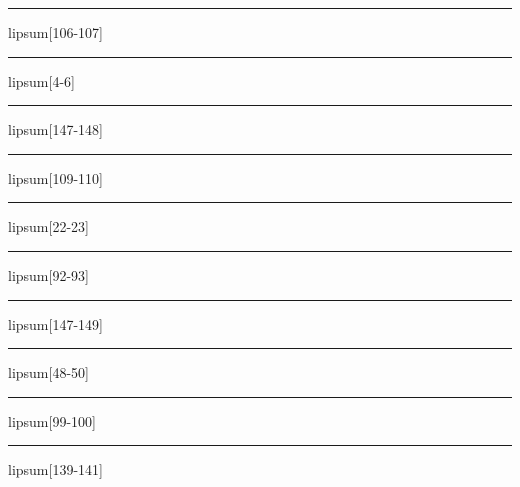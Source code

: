 \documentclass[11pt,a4paper]{article}
\begin{document}
\begin{simplewrap}
  \textcolor{cyan!46}{\rule{5.9cm}{8.8cm}}
\end{simplewrap}
lipsum[106-107]

\begin{simplewrap}
  \textcolor{red!23}{\rule{4.8cm}{8.7cm}}
\end{simplewrap}
lipsum[4-6]

\begin{simplewrap}
  \textcolor{magenta!25}{\rule{4.0cm}{6.6cm}}
\end{simplewrap}
lipsum[147-148]

\begin{simplewrap}
  \textcolor{olive!12}{\rule{3.1cm}{5.8cm}}
\end{simplewrap}
lipsum[109-110]

\begin{simplewrap}
  \textcolor{red!54}{\rule{5.5cm}{5.6cm}}
\end{simplewrap}
lipsum[22-23]

\begin{simplewrap}
  \textcolor{red!54}{\rule{5.2cm}{9.6cm}}
\end{simplewrap}
lipsum[92-93]

\begin{simplewrap}
  \textcolor{green!11}{\rule{4.4cm}{4.4cm}}
\end{simplewrap}
lipsum[147-149]

\begin{simplewrap}
  \textcolor{red!39}{\rule{4.4cm}{3.1cm}}
\end{simplewrap}
lipsum[48-50]

\begin{simplewrap}
  \textcolor{lime!50}{\rule{4.4cm}{7.1cm}}
\end{simplewrap}
lipsum[99-100]

\begin{simplewrap}
  \textcolor{brown!43}{\rule{3.1cm}{5.4cm}}
\end{simplewrap}
lipsum[139-141]
\end{document}
